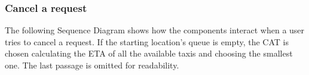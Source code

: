 \documentclass{article}
\begin{document}
	\subsubsection{Cancel a request}
	The following Sequence Diagram shows how the components interact when a user tries to cancel a request. If the starting location's queue is empty, the CAT is chosen calculating the ETA of all the available taxis and choosing the smallest one. The last passage is omitted for readability.
	\begin{figure}[H]
	\end{figure}
	\clearpage
\end{document}
